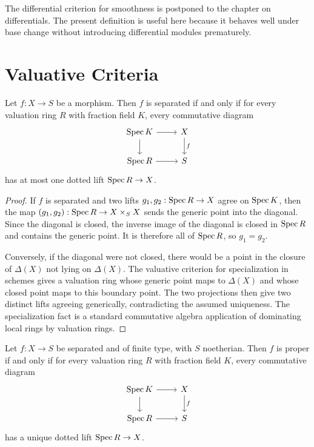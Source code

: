 \begin{remark}
The differential criterion for smoothness is postponed to the chapter on
differentials.  The present definition is useful here because it behaves well
under base change without introducing differential modules prematurely.
\end{remark}

\section{Valuative Criteria}

\begin{theorem}
Let \(f:X\to S\) be a morphism.  Then \(f\) is separated if and only if for
every valuation ring \(R\) with fraction field \(K\), every commutative diagram
\[
\begin{tikzcd}
\Spec K \arrow[r] \arrow[d] & X \arrow[d,"f"]\\
\Spec R \arrow[r] & S
\end{tikzcd}
\]
has at most one dotted lift \(\operatorname{Spec} R\to X\).
\end{theorem}

\begin{proof}
If \(f\) is separated and two lifts \(g_1,g_2:\operatorname{Spec} R\to X\) agree on
\(\operatorname{Spec} K\), then the map \((g_1,g_2):\operatorname{Spec} R\to X\times_S X\) sends the
generic point into the diagonal.  Since the diagonal is closed, the inverse
image of the diagonal is closed in \(\operatorname{Spec} R\) and contains the generic point.
It is therefore all of \(\operatorname{Spec} R\), so \(g_1=g_2\).

Conversely, if the diagonal were not closed, there would be a point in the
closure of \(\Delta(X)\) not lying on \(\Delta(X)\).  The valuative criterion
for specialization in schemes gives a valuation ring whose generic point maps
to \(\Delta(X)\) and whose closed point maps to this boundary point.  The two
projections then give two distinct lifts agreeing generically, contradicting
the assumed uniqueness.  The specialization fact is a standard commutative
algebra application of dominating local rings by valuation rings.
\end{proof}

\begin{theorem}
Let \(f:X\to S\) be separated and of finite type, with \(S\) noetherian.  Then
\(f\) is proper if and only if for every valuation ring \(R\) with fraction
field \(K\), every commutative diagram
\[
\begin{tikzcd}
\Spec K \arrow[r] \arrow[d] & X \arrow[d,"f"]\\
\Spec R \arrow[r] & S
\end{tikzcd}
\]
has a unique dotted lift \(\operatorname{Spec} R\to X\).
\end{theorem}

